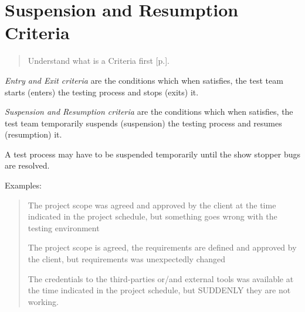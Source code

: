 \section{Suspension and Resumption Criteria}
\label{sec:Suspension and Resumption Criteria}
\begin{quote}
Understand what is a Criteria first [p.\pageref{sec:Criteria}].
\end{quote} 

\emph{Entry and Exit criteria} are the conditions which when satisfies, the test team starts (enters) the testing process and stops (exits) it.

\emph{Suspension and Resumption criteria} are the conditions which when satisfies, the test team temporarily suspends (suspension) the testing process and resumes (resumption) it.

A test process may have to be suspended temporarily until the show stopper bugs are resolved.

Examples:

    \begin{quote}
The project scope was agreed and approved by the client at the time indicated in the project schedule, but something goes wrong with the testing environment

    The project scope is agreed, the requirements are defined and approved by the client, but requirements was unexpectedly changed                                                                                                                                   

The credentials to the third-parties or/and external tools was available at the time indicated in the project schedule, but SUDDENLY they are not working.\end{quote} 
